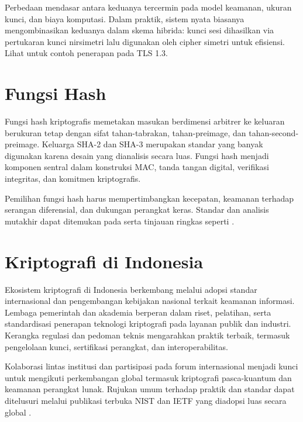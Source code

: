 \documentclass[../main.tex]{subfiles}
\begin{document}
Perbedaan mendasar antara keduanya tercermin pada model keamanan, ukuran kunci, dan biaya komputasi. Dalam praktik, sistem nyata biasanya mengombinasikan keduanya dalam skema hibrida: kunci sesi dihasilkan via pertukaran kunci nirsimetri lalu digunakan oleh cipher simetri untuk efisiensi. Lihat \textcite{rfc8446} untuk contoh penerapan pada TLS 1.3.

\section{Fungsi Hash}
Fungsi hash kriptografis memetakan masukan berdimensi arbitrer ke keluaran berukuran tetap dengan sifat tahan-tabrakan, tahan-preimage, dan tahan-second-preimage. Keluarga SHA-2 dan SHA-3 merupakan standar yang banyak digunakan karena desain yang dianalisis secara luas. Fungsi hash menjadi komponen sentral dalam konstruksi MAC, tanda tangan digital, verifikasi integritas, dan komitmen kriptografis.

Pemilihan fungsi hash harus mempertimbangkan kecepatan, keamanan terhadap serangan diferensial, dan dukungan perangkat keras. Standar dan analisis mutakhir dapat ditemukan pada \textcite{fips1804,fips202} serta tinjauan ringkas seperti \textcite{bertoni2013keccak}.

\section{Kriptografi di Indonesia}
Ekosistem kriptografi di Indonesia berkembang melalui adopsi standar internasional dan pengembangan kebijakan nasional terkait keamanan informasi. Lembaga pemerintah dan akademia berperan dalam riset, pelatihan, serta standardisasi penerapan teknologi kriptografi pada layanan publik dan industri. Kerangka regulasi dan pedoman teknis mengarahkan praktik terbaik, termasuk pengelolaan kunci, sertifikasi perangkat, dan interoperabilitas.

Kolaborasi lintas institusi dan partisipasi pada forum internasional menjadi kunci untuk mengikuti perkembangan global termasuk kriptografi pasca-kuantum dan keamanan perangkat lunak. Rujukan umum terhadap praktik dan standar dapat ditelusuri melalui publikasi terbuka NIST dan IETF yang diadopsi luas secara global \parencite{nist-sp800-175b,rfc5280}.
\end{document}
